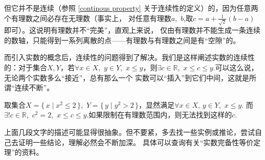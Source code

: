 但它并不是连续（参照 \autoref{continous property} 关于连续性的定义）的，因为任意两个有理数之间必存在无理数（事实上，
对任意有理数$a$,~$b$,取$c=a+\frac{1}{\sqrt{2}}(b-a)$即可）。这说明有理数并不“完美”，直观上来说，
仅由有理数并不能生成一条连续的数轴，只能得到一系列离散的点——有理数与有理数之间是有“空隙”的。


而引入实数的概念后，连续性的问题得到了解决。我们是这样阐述实数的连续性的：对于集合$X,Y$，若$\forall x\in X
    $,~$y\in Y$,~$x\leqslant y$，则$\exists c\in \mathbb{R}$,~$x\leqslant c\leqslant y$.可以这么说，无论两个实数多么“接近”，总有那么一个
实数可以“插入”到它们中间，这就是所谓“连续不断”。
\begin{example}
    取集合$X=\{\, x\mid x^2\leqslant 2\,\}$,~$Y=\{\, y\mid y^2>2\,\}$，显然满足$\forall x\in X,\,y\in Y$,~$x\leqslant y$.
    而$\exists ! c\in \mathbb{R}$,~$c^2=2$,~$x\leqslant c\leqslant y$.如果限制在有理数范围内，则无法找到这样的$c$.
\end{example}


上面几段文字的描述可能显得很抽象。但不要紧，多去找一些实例或推论，尝试自己去证明一些结论，理解必然会不断加深。
具体可以查询有关“实数完备性等价定理”的资料。
